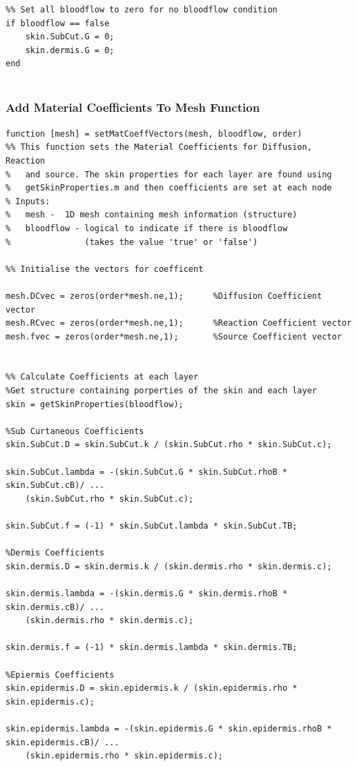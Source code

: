 \documentclass[11pt]{article}
\begin{document}
\begin{appendices}
\begin{lstlisting}
%% Set all bloodflow to zero for no bloodflow condition
if bloodflow == false
    skin.SubCut.G = 0;
    skin.dermis.G = 0;
end
       
\end{lstlisting}
\clearpage
\subsubsection{Add Material Coefficients To Mesh Function}
\begin{lstlisting}
function [mesh] = setMatCoeffVectors(mesh, bloodflow, order)
%% This function sets the Material Coefficients for Diffusion, Reaction
%   and source. The skin properties for each layer are found using
%   getSkinProperties.m and then coefficients are set at each node
% Inputs:
%   mesh -  1D mesh containing mesh information (structure)
%   bloodflow - logical to indicate if there is bloodflow
%               (takes the value 'true' or 'false')

%% Initialise the vectors for coefficent

mesh.DCvec = zeros(order*mesh.ne,1);      %Diffusion Coefficient vector
mesh.RCvec = zeros(order*mesh.ne,1);      %Reaction Coefficient vector
mesh.fvec = zeros(order*mesh.ne,1);       %Source Coefficient vector


%% Calculate Coefficients at each layer
%Get structure containing porperties of the skin and each layer
skin = getSkinProperties(bloodflow);

%Sub Curtaneous Coefficients
skin.SubCut.D = skin.SubCut.k / (skin.SubCut.rho * skin.SubCut.c);

skin.SubCut.lambda = -(skin.SubCut.G * skin.SubCut.rhoB * skin.SubCut.cB)/ ...
    (skin.SubCut.rho * skin.SubCut.c);

skin.SubCut.f = (-1) * skin.SubCut.lambda * skin.SubCut.TB;

%Dermis Coefficients
skin.dermis.D = skin.dermis.k / (skin.dermis.rho * skin.dermis.c);

skin.dermis.lambda = -(skin.dermis.G * skin.dermis.rhoB * skin.dermis.cB)/ ...
    (skin.dermis.rho * skin.dermis.c);

skin.dermis.f = (-1) * skin.dermis.lambda * skin.dermis.TB;

%Epiermis Coefficients
skin.epidermis.D = skin.epidermis.k / (skin.epidermis.rho * skin.epidermis.c);

skin.epidermis.lambda = -(skin.epidermis.G * skin.epidermis.rhoB * skin.epidermis.cB)/ ...
    (skin.epidermis.rho * skin.epidermis.c);


\end{lstlisting}
\end{appendices}
\end{document}
